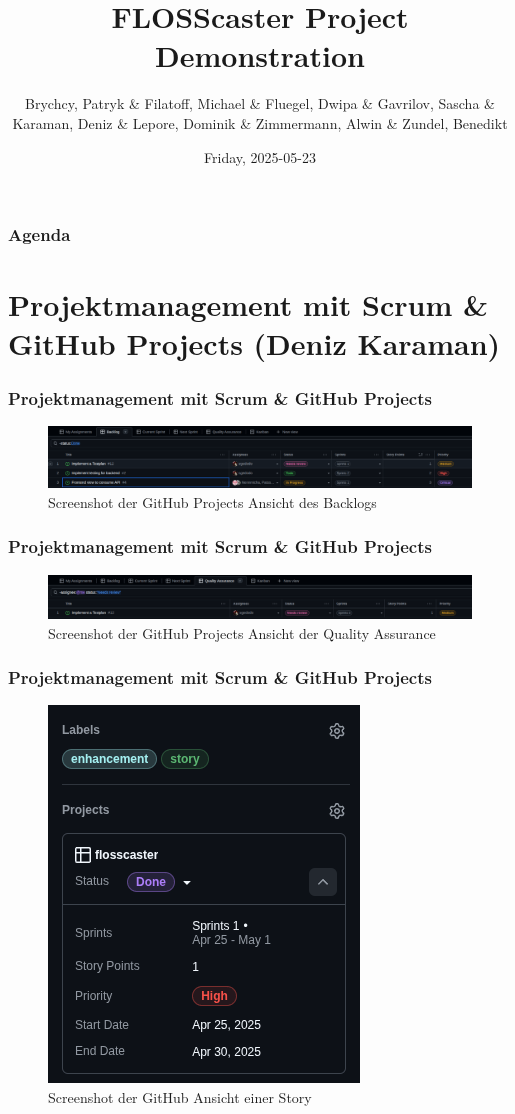 \documentclass{beamer}
\title[FLOSScaster Presentation 2025-05-23]{FLOSScaster Project Demonstration}
\author{
  Brychcy, Patryk
  \&
  Filatoff, Michael
  \&
  Fluegel, Dwipa
  \&
  Gavrilov, Sascha
  \&
  Karaman, Deniz
  \&
  Lepore, Dominik
  \&
  Zimmermann, Alwin
  \&
  Zundel, Benedikt
}
\institute{Frankfurt University of Applied Sciences}
\date{Friday, 2025-05-23}
\begin{document}
\frame{\titlepage}

\begin{frame}
	\frametitle{Agenda}
	\tableofcontents
\end{frame}

\section{Projektmanagement mit Scrum \& GitHub Projects \small{(Deniz Karaman)}}
\begin{frame}
  \frametitle{Projektmanagement mit Scrum \& GitHub Projects}
  \begin{figure}[h]
    \caption{Screenshot der GitHub Projects Ansicht des Backlogs}
    \centering
    \includegraphics[width=\textwidth]{backlog.png}
  \end{figure}
\end{frame}

\begin{frame}
  \frametitle{Projektmanagement mit Scrum \& GitHub Projects}
  \begin{figure}[h]
    \caption{Screenshot der GitHub Projects Ansicht der Quality Assurance}
    \centering
    \includegraphics[width=\textwidth]{quality_assurance.png}
  \end{figure}
\end{frame}

\begin{frame}
  \frametitle{Projektmanagement mit Scrum \& GitHub Projects}
  \begin{figure}[h]
    \caption{Screenshot der GitHub Ansicht einer Story}
    \centering
    \includegraphics[width=.3\textwidth]{overview.png}
  \end{figure}
\end{frame}
\end{document}
